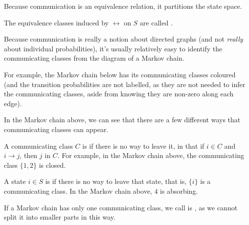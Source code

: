 \documentclass[a4paper]{scrartcl}
\begin{document}
Because communication is an equivalence relation, it partitions the state space.

\begin{definition}
	The equivalence classes induced by $\longleftrightarrow$ on $S$ are called .
\end{definition}

Because communication is really a notion about directed graphs (and not \emph{really} about individual probabilities), it's usually relatively easy to identify the communicating classes from the diagram of a Markov chain.

For example, the Markov chain below has its communicating classes coloured (and the transition probabilities are not labelled, as they are not needed to infer the communicating classes, aside from knowing they are non-zero along each edge).

\begin{center}
\end{center}

In the Markov chain above, we can see that there are a few different ways that communicating classes can appear.

A communicating class $C$ is  if there is no way to leave it, in that if $i \in C$ and $i \rightarrow j$, then $j$ in $C$. For example, in the Markov chain above, the communicating class $\{1, 2\}$ is closed.

A state $i \in S$ is  if there is no way to leave that state, that is, $\{i\}$ is a communicating class. In the Markov chain above, $4$ is absorbing.

If a Markov chain has only one communicating class, we call is , as we cannot split it into smaller parts in this way.
\end{document}
